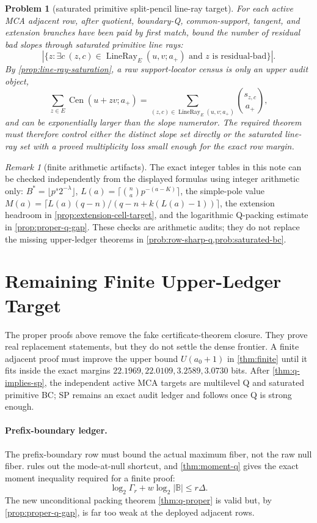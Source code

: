 \documentclass[a4paper,11pt]{amsart}
\newtheorem{problem}[theorem]{Problem}
\theoremstyle{remark}
\newtheorem{remark}[theorem]{Remark}
\newcommand{\B}{\mathbb B}
\newcommand{\Cen}{\operatorname{Cen}}
\newcommand{\LineRay}{\operatorname{LineRay}}
\begin{document}
\begin{problem}[saturated primitive split-pencil line-ray target]\label{prob:saturated-bc}
For each active MCA adjacent row, after quotient, boundary-Q, common-support, tangent, and extension branches have been paid by first match, bound the number of residual bad slopes through saturated primitive line rays:
\[
        |\{z:\exists c\ (z,c)\in\LineRay_E(u,v;a_+)\text{ and }z\text{ is residual-bad}\}|.
\]
By \cref{prop:line-ray-saturation}, a raw support-locator census is only an upper audit object,
\[
        \sum_{z\in E}\Cen(u+zv;a_+)
        =
        \sum_{(z,c)\in\LineRay_E(u,v;a_+)}\binom{s_{z,c}}{a_+},
\]
and can be exponentially larger than the slope numerator.  The required theorem must therefore control either the distinct slope set directly or the saturated line-ray set with a proved multiplicity loss small enough for the exact row margin.
\end{problem}

\begin{remark}[finite arithmetic artifacts]\label{rem:finite-arithmetic-artifacts}
The exact integer tables in this note can be checked independently from the displayed formulas using integer arithmetic only: \(B^*=\lfloor p^s2^{-\lambda}\rfloor\), \(L(a)=\lceil\binom na p^{-(a-K)}\rceil\), the simple-pole value \(M(a)=\lceil L(a)(q-n)/(q-n+k(L(a)-1))\rceil\), the extension headroom in \cref{prop:extension-cell-target}, and the logarithmic Q-packing estimate in \cref{prop:proper-q-gap}.  These checks are arithmetic audits; they do not replace the missing upper-ledger theorems in \cref{prob:row-sharp-q,prob:saturated-bc}.
\end{remark}

\section{Remaining Finite Upper-Ledger Target}

The proper proofs above remove the fake certificate-theorem closure.  They prove real replacement statements, but they do not settle the dense frontier.  A finite adjacent proof must improve the upper bound \(U(a_0+1)\) in \cref{thm:finite} until it fits inside the exact margins \(22.1969,22.0109,3.2589,3.0730\) bits.  After \cref{thm:q-implies-sp}, the independent active MCA targets are multilevel Q and saturated primitive BC; SP remains an exact audit ledger and follows once Q is strong enough.

\paragraph{Prefix-boundary ledger.}  The prefix-boundary row must bound the actual maximum fiber, not the raw null fiber.   rules out the mode-at-null shortcut, and \cref{thm:moment-q} gives the exact moment inequality required for a finite proof:
\[
        \log_2\Gamma_r+w\log_2|\B|\le r\Delta .
\]
The new unconditional packing theorem \cref{thm:q-proper} is valid but, by \cref{prop:proper-q-gap}, is far too weak at the deployed adjacent rows.
\end{document}
